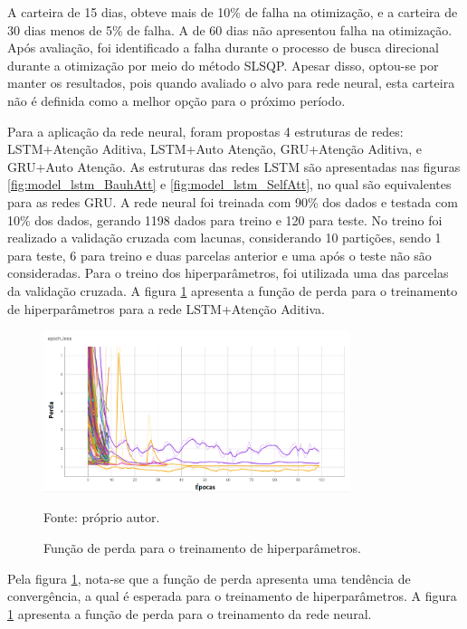         \ipar A carteira de 15 dias, obteve mais de 10\% de falha na otimização, e a carteira de 30 dias menos de 5\% de falha. A de 60 dias não apresentou falha na otimização. Após avaliação, foi identificado a falha durante o processo de busca direcional durante a otimização por meio do método \acrshort{SLSQP}. Apesar disso, optou-se por manter os resultados, pois quando avaliado o alvo para rede neural, esta carteira não é definida como a melhor opção para o próximo período. 

        \ipar Para a aplicação da rede neural, foram propostas 4 estruturas de redes: \acrshort{LSTM}+Atenção Aditiva, \acrshort{LSTM}+Auto Atenção, \acrshort{GRU}+Atenção Aditiva, e \acrshort{GRU}+Auto Atenção. As estruturas das redes \acrshort{LSTM} são apresentadas nas figuras \ref{fig:model_lstm_BauhAtt} e \ref{fig:model_lstm_SelfAtt}, no qual são equivalentes para as redes \acrshort{GRU}. A rede neural foi treinada com 90\% dos dados e testada com 10\% dos dados, gerando 1198 dados para treino e 120 para teste. No treino foi realizado a validação cruzada com lacunas, considerando 10 partições, sendo 1 para teste, 6 para treino e duas parcelas anterior e uma após o teste não são consideradas. Para o treino dos hiperparâmetros, foi utilizada uma das parcelas da validação cruzada. A figura \ref{fig:loss} apresenta a função de perda para o treinamento de hiperparâmetros para a rede \acrshort{LSTM}+Atenção Aditiva.

        \begin{figure}[H]
            \centering
            \caption{Função de perda para o treinamento de hiperparâmetros.}
            \label{fig:loss}
            \includegraphics[width=0.8\textwidth]{./imagens/epoch_loss.png}
            \par \footnotesize Fonte: próprio autor.
        \end{figure}

        \ipar Pela figura \ref{fig:loss}, nota-se que a função de perda apresenta uma tendência de convergência, a qual é esperada para o treinamento de hiperparâmetros. A figura \ref{fig:loss} apresenta a função de perda para o treinamento da rede neural.

